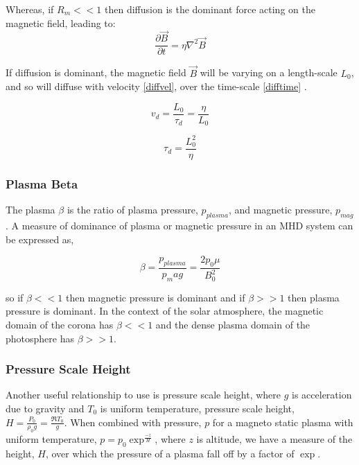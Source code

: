 Whereas, if $R_m << 1$ then diffusion is the dominant force acting on the magnetic field, leading to:
\begin{equation}\label{r<<1}
\frac{\partial \vec{B}}{\partial t}=\eta\nabla^{2}\vec{B}
\end{equation}

If diffusion is dominant, the magnetic field $\vec{B}$ will be varying on a length-scale $L_0$, and so will diffuse with velocity \ref{diffvel}, over the time-scale \ref{difftime} \citep{2003dysu.book.....D}.

\begin{equation}\label{diffvel}
v_d=\frac{L_0}{\tau_d} = \frac{\eta}{L_0}
\end{equation}


\begin{equation}\label{difftime}
\tau_d = \frac{L_{0}^{2}}{\eta}
\end{equation}



%
\subsubsection{Plasma Beta}
The plasma $\beta$ is the ratio of plasma pressure, $p_{plasma}$, and magnetic pressure, $p_{mag}$. A measure of dominance of plasma or magnetic pressure in an MHD system can be expressed as, 

\begin{equation}\label{beta}
\beta=\frac{p_{plasma}}{p_mag} = \frac{2p_{0}\mu}{B_{0}^2}
\end{equation}

so if $\beta << 1$ then magnetic pressure is dominant and if $\beta >> 1$ then plasma pressure is dominant. In the context of the solar atmosphere, the magnetic domain of the corona has $\beta << 1$ and the dense plasma domain of the photosphere has $\beta >> 1$.

\subsubsection{Pressure Scale Height}
Another useful relationship to use is pressure scale height, where $g$ is acceleration due to gravity and $T_0$ is uniform temperature, pressure scale height, $H=\frac{P_0}{\rho_{0}g} = \frac{\Re T_{0}}{g}$. When combined with pressure, $p$ for a magneto static plasma with uniform temperature, $p=p_{0}\exp^{\frac{-z}{H}}$, where $z$ is altitude, we have a measure of the height, $H$, over which the pressure of a plasma fall off by a factor of $\exp$. 


